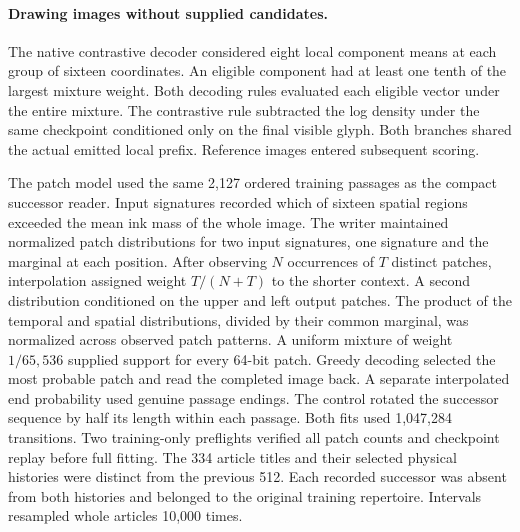 \paragraph{Drawing images without supplied candidates.}
The native contrastive decoder considered eight local component means at
each group of sixteen coordinates. An eligible component had at least one
tenth of the largest mixture weight. Both decoding rules evaluated each
eligible vector under the entire mixture. The contrastive rule subtracted
the log density under the same checkpoint conditioned only on the final
visible glyph. Both branches shared the actual emitted local prefix.
Reference images entered subsequent scoring.

The patch model used the same 2,127 ordered training passages as the compact
successor reader. Input signatures recorded which of sixteen spatial
regions exceeded the mean ink mass of the whole image. The writer maintained
normalized patch distributions for two input signatures, one signature and
the marginal at each position. After observing $N$ occurrences of $T$ distinct
patches, interpolation assigned weight $T/(N+T)$ to the shorter context.
A second distribution conditioned on the upper and left output patches.
The product of the temporal and spatial distributions, divided by their
common marginal, was normalized across observed patch patterns. A uniform
mixture of weight $1/65{,}536$ supplied support for every 64-bit patch.
Greedy decoding selected the most probable patch and read the completed
image back. A separate interpolated end probability used genuine passage
endings. The control rotated the successor sequence by half its length
within each passage. Both fits used 1,047,284 transitions. Two training-only
preflights verified all patch counts and checkpoint replay before full fitting.
The 334 article titles and their selected physical histories were distinct
from the previous 512. Each recorded successor was absent from both histories
and belonged to the original training repertoire. Intervals resampled whole
articles 10,000 times.

